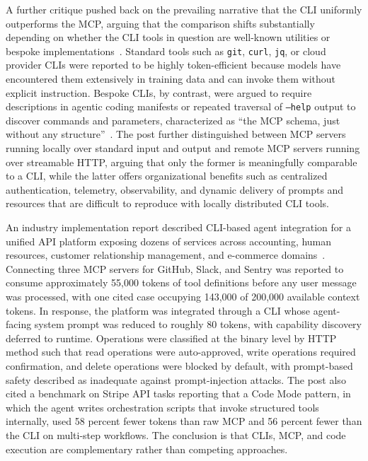 \documentclass[
english,                 %
bibtex,                  %
includeExtraAbstracts, %
]{kththesis}
\numberwithin{listing}{chapter}
\begin{document}
A further critique pushed back on the prevailing narrative that the \gls{CLI} uniformly outperforms the \gls{MCP}, arguing that the comparison shifts substantially depending on whether the \gls{CLI} tools in question are well-known utilities or bespoke implementations~\cite{chen_mcp_2026}. Standard tools such as \texttt{git}, \texttt{curl}, \texttt{jq}, or cloud provider \glspl{CLI} were reported to be highly token-efficient because models have encountered them extensively in training data and can invoke them without explicit instruction. Bespoke \glspl{CLI}, by contrast, were argued to require descriptions in agentic coding manifests or repeated traversal of \texttt{--help} output to discover commands and parameters, characterized as ``the \gls{MCP} schema, just without any structure''~\cite{chen_mcp_2026}. The post further distinguished between \gls{MCP} servers running locally over standard input and output and remote \gls{MCP} servers running over streamable \gls{HTTP}, arguing that only the former is meaningfully comparable to a \gls{CLI}, while the latter offers organizational benefits such as centralized authentication, telemetry, observability, and dynamic delivery of prompts and resources that are difficult to reproduce with locally distributed \gls{CLI} tools.

An industry implementation report described \gls{CLI}-based agent integration for a unified \gls{API} platform exposing dozens of services across accounting, human resources, customer relationship management, and e-commerce domains~\cite{amzani_your_2026}. Connecting three \gls{MCP} servers for GitHub, Slack, and Sentry was reported to consume approximately 55,000 tokens of tool definitions before any user message was processed, with one cited case occupying 143,000 of 200,000 available context tokens. In response, the platform was integrated through a \gls{CLI} whose agent-facing system prompt was reduced to roughly 80 tokens, with capability discovery deferred to runtime. Operations were classified at the binary level by \gls{HTTP} method such that read operations were auto-approved, write operations required confirmation, and delete operations were blocked by default, with prompt-based safety described as inadequate against prompt-injection attacks. The post also cited a benchmark on Stripe \gls{API} tasks reporting that a Code Mode pattern, in which the agent writes orchestration scripts that invoke structured tools internally, used 58 percent fewer tokens than raw \gls{MCP} and 56 percent fewer than the \gls{CLI} on multi-step workflows. The conclusion is that \glspl{CLI}, \gls{MCP}, and code execution are complementary rather than competing approaches.
\end{document}
